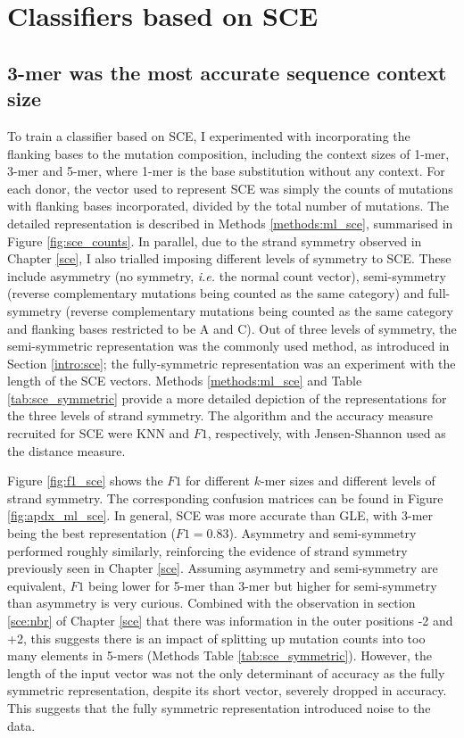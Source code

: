 

\section{Classifiers based on SCE}\label{ml:sce}

\subsection{3-mer was the most accurate sequence context size}
To train a classifier based on SCE, I experimented with incorporating the flanking bases to the mutation composition, including the context sizes of 1-mer, 3-mer and 5-mer, where 1-mer is the base substitution without any context. For each donor, the vector used to represent SCE was simply the counts of mutations with flanking bases incorporated, divided by the total number of mutations. The detailed representation is described in Methods \ref{methods:ml_sce}, summarised in Figure \ref{fig:sce_counts}. In parallel, due to the strand symmetry observed in Chapter \ref{sce}, I also trialled imposing different levels of symmetry to SCE. These include asymmetry (no symmetry, \textit{i.e.} the normal count vector), semi-symmetry (reverse complementary mutations being counted as the same category) and full-symmetry (reverse complementary mutations being counted as the same category and flanking bases restricted to be A and C). Out of three levels of symmetry, the semi-symmetric representation was the commonly used method, as introduced in Section \ref{intro:sce}; the fully-symmetric representation was an experiment with the length of the SCE vectors. Methods \ref{methods:ml_sce} and Table \ref{tab:sce_symmetric} provide a more detailed depiction of the representations for the three levels of strand symmetry. The algorithm and the accuracy measure recruited for SCE were KNN and $F1$, respectively, with Jensen-Shannon used as the distance measure. 

Figure \ref{fig:f1_sce} shows the $F1$ for different $k$-mer sizes and different levels of strand symmetry. The corresponding confusion matrices can be found in Figure \ref{fig:apdx_ml_sce}. In general, SCE was more accurate than GLE, with 3-mer being the best representation ($F1=0.83$). Asymmetry and semi-symmetry performed roughly similarly, reinforcing the evidence of strand symmetry previously seen in Chapter \ref{sce}. Assuming asymmetry and semi-symmetry are equivalent, $F1$ being lower for 5-mer than 3-mer but higher for semi-symmetry than asymmetry is very curious. Combined with the observation in section \ref{sce:nbr} of Chapter \ref{sce} that there was information in the outer positions -2 and +2, this suggests there is an impact of splitting up mutation counts into too many elements in 5-mers (Methods Table \ref{tab:sce_symmetric}). However, the length of the input vector was not the only determinant of accuracy as the fully symmetric representation, despite its short vector, severely dropped in accuracy. This suggests that the fully symmetric representation introduced noise to the data.

